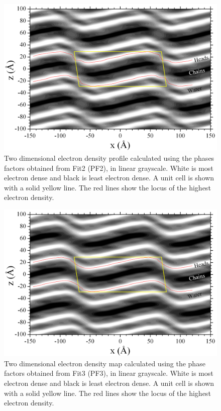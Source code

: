 \begin{landscape}
\begin{figure}[htbp]
  \centering
  \includegraphics[width=0.85\linewidth]{figures/ripple/LAXS/Fit2_2D_edp}
  \caption[Two dimensional electron density profile calculated using the phases
  factors obtained from Fit2 (PF2), in linear grayscale]
  {Two dimensional electron density profile calculated using the phases
  factors obtained from Fit2 (PF2), in linear grayscale.
  White is most electron dense and black is least electron dense. 
  A unit cell is shown with a solid yellow line. 
  The red lines show the locus of the highest electron density.}
  \label{fig:PF2_2D_edp}
\end{figure}
\end{landscape}

\begin{landscape}
\begin{figure}
  \centering
  \includegraphics[width=0.85\linewidth]{figures/ripple/LAXS/Fit3_2D_edp}
  \caption[Two dimensional electron density map calculated using the phase
  factors obtained from Fit3 (PF3), in linear grayscale]
  {Two dimensional electron density map calculated using the phase
  factors obtained from Fit3 (PF3), in linear grayscale.
  White is most electron dense and black is least electron dense. 
  A unit cell is shown with a solid yellow line. 
  The red lines show the locus of the highest electron density.}
  \label{fig:PF3_2D_edp}
\end{figure}
\end{landscape}

